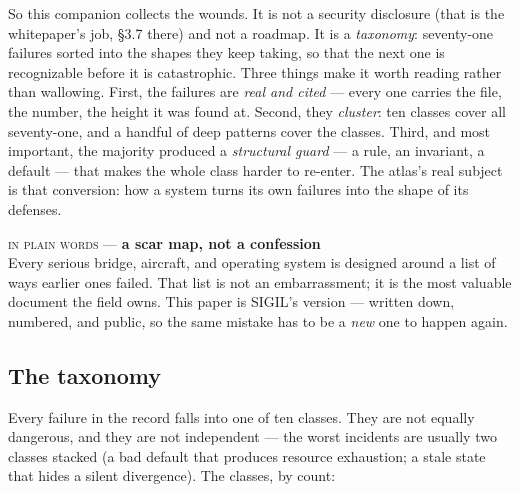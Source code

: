 \documentclass[10pt,a4paper]{article}
\newcommand{\layman}[3]{%
\begin{tcolorbox}[enhanced,
  interior style={left color=#1!9,right color=white},
  colframe=#1!45!slate,boxrule=0.5pt,arc=3pt,
  borderline west={2.5pt}{0pt}{#1},
  left=9pt,right=9pt,top=7pt,bottom=7pt]
{\scriptsize\textcolor{#1}{\textsc{in plain words}}\; — \;\textbf{\small #2}}\\[3pt]
\small #3
\end{tcolorbox}}
\begin{document}
So this companion collects the wounds. It is not a security disclosure (that is the
whitepaper's job, \S3.7 there) and not a roadmap. It is a \emph{taxonomy}: seventy-one
failures sorted into the shapes they keep taking, so that the next one is recognizable
before it is catastrophic. Three things make it worth reading rather than wallowing.
First, the failures are \emph{real and cited} — every one carries the file, the number,
the height it was found at. Second, they \emph{cluster}: ten classes cover all
seventy-one, and a handful of deep patterns cover the classes. Third, and most
important, the majority produced a \emph{structural guard} — a rule, an invariant, a
default — that makes the whole class harder to re-enter. The atlas's real subject is
that conversion: how a system turns its own failures into the shape of its defenses.

\layman{sigilviolet}{a scar map, not a confession}{Every serious bridge, aircraft, and
operating system is designed around a list of ways earlier ones failed. That list is not
an embarrassment; it is the most valuable document the field owns. This paper is SIGIL's
version — written down, numbered, and public, so the same mistake has to be a
\emph{new} one to happen again.}

\subsection{The taxonomy}

Every failure in the record falls into one of ten classes. They are not equally
dangerous, and they are not independent — the worst incidents are usually two classes
stacked (a bad default that produces resource exhaustion; a stale state that hides a
silent divergence). The classes, by count:
\end{document}
